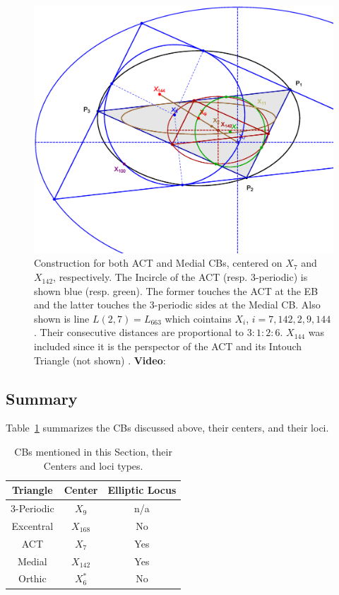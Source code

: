 \begin{figure}
    \centering
    \includegraphics[width=\textwidth]{pics_eps_new/0120_actMedCircumAll.eps}
    \caption{Construction for both ACT and Medial CBs, centered on $X_7$ and $X_{142}$, respectively. The Incircle of the ACT (resp. 3-periodic) is shown blue (resp. green). The former touches the ACT at the EB and the latter touches the 3-periodic sides at the Medial CB. Also shown is line $L(2,7)=L_{663}$ which cointains $X_i$, $i=7,142,2,9,144$. Their consecutive distances are proportional to $3:1:2:6$. $X_{144}$ was included since it is the perspector of the ACT and its Intouch Triangle (not shown) \cite{mw}. \textbf{Video}: \cite[PL\#04,05]{reznik2020-playlist-circum}}
    \label{fig:cb_act_med_superposed}
\end{figure}



\subsection{Summary}

Table~\ref{tab:cb_summary} summarizes the CBs discussed above, their centers, and their loci.

\begin{table}[H]
\begin{tabular}{|c|c|c|}
\hline
Triangle & Center & Elliptic Locus \\
\hline
3-Periodic & $X_9$ & n/a \\
Excentral & $X_{168}$ & No\\
ACT & $X_{7}$ & Yes \\
Medial & $X_{142}$ & Yes \\
Orthic & $X_6^*$ & No \\
\hline
\end{tabular}
\caption{CBs mentioned in this Section, their Centers and loci types.}
\label{tab:cb_summary}
\end{table}

